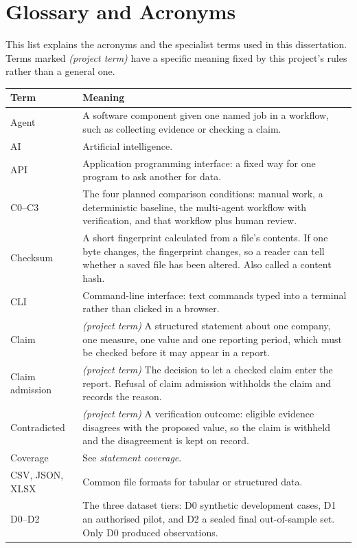 \chapter*{Glossary and Acronyms}

\noindent This list explains the acronyms and the specialist terms used in this dissertation. Terms
marked \textit{(project term)} have a specific meaning fixed by this project's rules rather than a
general one.

\begin{longtable}{P{0.20\textwidth}P{0.72\textwidth}}
\toprule
\textbf{Term} & \textbf{Meaning} \\
\midrule
\endhead
Agent & A software component given one named job in a workflow, such as collecting evidence or checking a claim. \\
AI & Artificial intelligence. \\
API & Application programming interface: a fixed way for one program to ask another for data. \\
C0--C3 & The four planned comparison conditions: manual work, a deterministic baseline, the multi-agent workflow with verification, and that workflow plus human review. \\
Checksum & A short fingerprint calculated from a file's contents. If one byte changes, the fingerprint changes, so a reader can tell whether a saved file has been altered. Also called a content hash. \\
CLI & Command-line interface: text commands typed into a terminal rather than clicked in a browser. \\
Claim & \textit{(project term)} A structured statement about one company, one measure, one value and one reporting period, which must be checked before it may appear in a report. \\
Claim admission & \textit{(project term)} The decision to let a checked claim enter the report. Refusal of claim admission withholds the claim and records the reason. \\
Contradicted & \textit{(project term)} A verification outcome: eligible evidence disagrees with the proposed value, so the claim is withheld and the disagreement is kept on record. \\
Coverage & See \textit{statement coverage}. \\
CSV, JSON, XLSX & Common file formats for tabular or structured data. \\
D0--D2 & The three dataset tiers: D0 synthetic development cases, D1 an authorised pilot, and D2 a sealed final out-of-sample set. Only D0 produced observations. \\

\end{longtable}
